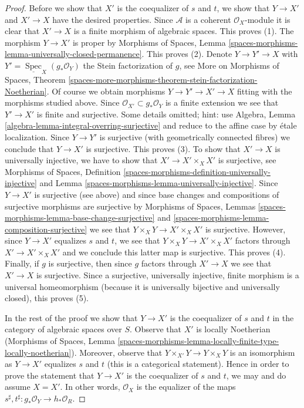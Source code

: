 \documentclass{stacks-project}
\theoremstyle{plain}
\theoremstyle{definition}
\theoremstyle{remark}
\numberwithin{equation}{subsection}
\def\Spec{\mathop{\mathrm{Spec}}}
\begin{document}
\begin{proof}
\medskip\noindent
Before we show that $X'$ is the coequalizer of $s$ and $t$, we show
that $Y \to X'$ and $X' \to X$ have the desired properties. Since $\mathcal{A}$
is a coherent $\mathcal{O}_X$-module it is clear that $X' \to X$ is a
finite morphism of algebraic spaces. This proves (1).
The morphism $Y \to X'$ is proper by Morphisms of Spaces, Lemma
\ref{spaces-morphisms-lemma-universally-closed-permanence}. This proves (2).
Denote $Y \to Y' \to X$ with
$Y' = \underline{\Spec}_X(g_*\mathcal{O}_Y)$ the Stein factorization of $g$,
see More on Morphisms of Spaces, Theorem
\ref{spaces-more-morphisms-theorem-stein-factorization-Noetherian}.
Of course we obtain morphisms $Y \to Y' \to X' \to X$ fitting
with the morphisms studied above.
Since $\mathcal{O}_{X'} \subset g_*\mathcal{O}_Y$ is a finite extension
we see that $Y' \to X'$ is finite and surjective.
Some details omitted; hint: use
Algebra, Lemma \ref{algebra-lemma-integral-overring-surjective}
and reduce to the affine case by \'etale localization.
Since $Y \to Y'$ is surjective (with geometrically connected fibres)
we conclude that $Y \to X'$ is surjective. This proves (3).
To show that $X' \to X$ is universally injective, we have to show
that $X' \to X' \times_X X'$ is surjective, see
Morphisms of Spaces, Definition
\ref{spaces-morphisms-definition-universally-injective} and
Lemma \ref{spaces-morphisms-lemma-universally-injective}.
Since $Y \to X'$ is surjective (see above) and since base changes
and compositions of surjective morphisms are surjective by
Morphisms of Spaces, Lemmas
\ref{spaces-morphisms-lemma-base-change-surjective} and
\ref{spaces-morphisms-lemma-composition-surjective}
we see that $Y \times_X Y \to X' \times_X X'$ is surjective.
However, since $Y \to X'$ equalizes $s$ and $t$, we see that
$Y \times_X Y \to X' \times_X X'$ factors through $X' \to X' \times_X X'$
and we conclude this latter map is surjective. This proves (4).
Finally, if $g$ is surjective, then since $g$ factors through $X' \to X$
we see that $X' \to X$ is surjective. Since a surjective, universally
injective, finite morphism is a universal homeomorphism (because it
is universally bijective and universally closed), this proves (5).

\medskip\noindent
In the rest of the proof we show that $Y \to X'$ is the coequalizer
of $s$ and $t$ in the category of algebraic spaces over $S$.
Observe that $X'$ is locally Noetherian
(Morphisms of Spaces, Lemma
\ref{spaces-morphisms-lemma-locally-finite-type-locally-noetherian}).
Moreover, observe that $Y \times_{X'} Y \to Y \times_X Y$ is an
isomorphism as $Y \to X'$ equalizes $s$ and $t$ (this is a categorical
statement). Hence in order to prove the statement that $Y \to X'$
is the coequalizer of $s$ and $t$, we may and do assume $X = X'$.
In other words, $\mathcal{O}_X$ is the equalizer of the maps
$s^\sharp, t^\sharp : g_*\mathcal{O}_Y \to h_*\mathcal{O}_R$.


\end{proof}
\end{document}
